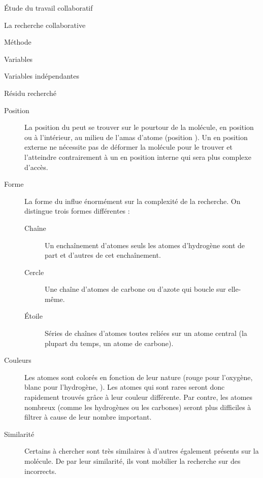\documentclass[myfrancais]{mythesis}
\begin{document}
\begin{mypart}{Étude du travail collaboratif}
\begin{mychapter}{La recherche collaborative}
\begin{mysection}{Méthode}
\begin{mysubsection}{Variables}
\begin{mysubsubsection}{Variables indépendantes}
\begin{myparagraph}{ Résidu recherché}
\begin{description}
								\item[Position] La position du  peut se trouver sur le pourtour de la molécule, en position  ou à l'intérieur, au milieu de l'amas d'atome (position ).
									Un  en position externe ne nécessite pas de déformer la molécule pour le trouver et l'atteindre contrairement à un  en position interne qui sera plus complexe d'accès.
								\item[Forme] La forme du  influe énormément sur la complexité de la recherche.
									On distingue trois formes différentes :
									\begin{description}
										\item[Chaîne] Un enchaînement d'atomes seuls les atomes d'hydrogène sont de part et d'autres de cet enchaînement.
										\item[Cercle] Une chaîne d'atomes de carbone ou d'azote qui boucle sur elle-même.
										\item[Étoile] Séries de chaînes d'atomes toutes reliées sur un atome central (la plupart du temps, un atome de carbone).
									\end{description}
								\item[Couleurs] Les atomes sont colorés en fonction de leur nature (rouge pour l'oxygène, blanc pour l'hydrogène, \myetc).
									Les atomes qui sont rares seront donc rapidement trouvés grâce à leur couleur différente.
									Par contre, les atomes nombreux (comme les hydrogènes ou les carbones) seront plus difficiles à filtrer à cause de leur nombre important.
								\item[Similarité] Certains  à chercher sont très similaires à d'autres  également présents sur la molécule.
									De par leur similarité, ils vont mobilier la recherche sur des  incorrects.
							\end{description}


\end{myparagraph}
\end{mysubsubsection}
\end{mysubsection}
\end{mysection}
\end{mychapter}
\end{mypart}
\end{document}
